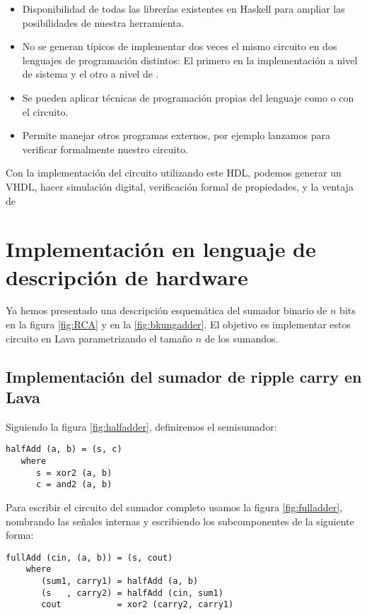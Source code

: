 \begin{itemize}
\item Disponibilidad de todas las librerías existentes en Haskell para ampliar las posibilidades de nuestra herramienta.
\item No se generan  típicos de implementar dos veces el mismo circuito en dos lenguajes de programación distintos: El primero en la implementación a nivel de sistema y el otro a nivel de .
\item Se pueden aplicar técnicas de programación propias del lenguaje como  o  con el circuito.
\item Permite manejar otros programas externos, por ejemplo lanzamos \cite{minisat} para verificar formalmente nuestro circuito.  
\end{itemize}


Con la implementación del circuito utilizando este HDL, podemos generar un  VHDL, hacer simulación digital, verificación formal de propiedades, y la ventaja de  


\section{Implementación en lenguaje de descripción de hardware}
Ya hemos presentado una descripción esquemática del sumador binario de \(n\) bits en la figura \ref{fig:RCA} y en la \ref{fig:bkungadder}. El objetivo es implementar estos circuito en Lava parametrizando el tamaño \(n\) de los sumandos. 

\subsection{Implementación del sumador de \textbf {ripple carry} en Lava}

\noindent Siguiendo la figura \ref{fig:halfadder}, definiremos el semisumador:
\begin{lstlisting}
halfAdd (a, b) = (s, c)
   where
      s = xor2 (a, b)
      c = and2 (a, b)
\end{lstlisting}
\noindent Para escribir el circuito del sumador completo usamos la figura \ref{fig:fulladder}, nombrando las señales internas y 
escribiendo los subcomponentes de la siguiente forma:
\begin{lstlisting}
fullAdd (cin, (a, b)) = (s, cout)
    where
       (sum1, carry1) = halfAdd (a, b)
       (s   , carry2) = halfAdd (cin, sum1)
       cout           = xor2 (carry2, carry1)
\end{lstlisting}

